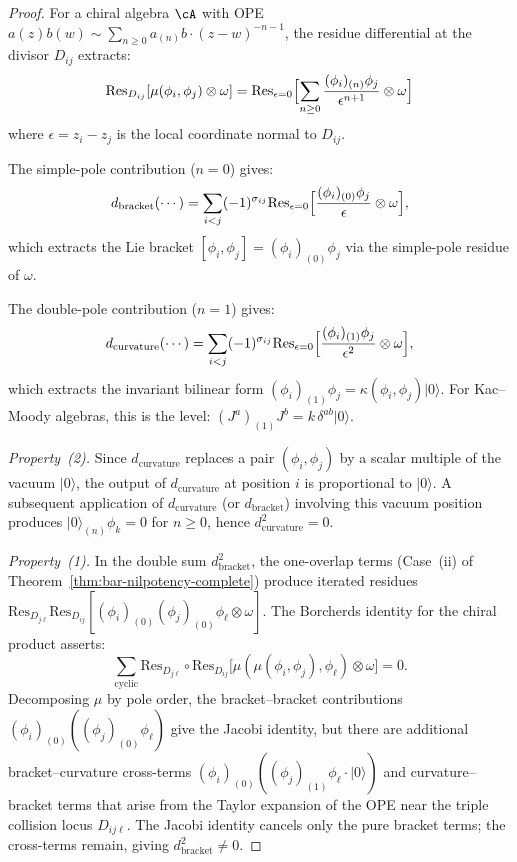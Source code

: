 \begin{proof}
For a chiral algebra $\cA$ with OPE $a(z)b(w) \sim \sum_{n \geq 0} a_{(n)}b \cdot (z-w)^{-n-1}$, the residue differential at the divisor $D_{ij}$ extracts:
\[
\mathrm{Res}_{D_{ij}}[\mu(\phi_i, \phi_j) \otimes \omega]
  = \mathrm{Res}_{\epsilon=0}\Bigl[\sum_{n \geq 0}
    \frac{(\phi_i)_{(n)}\phi_j}{\epsilon^{n+1}} \otimes \omega\Bigr]
\]
where $\epsilon = z_i - z_j$ is the local coordinate normal to $D_{ij}$.

The simple-pole contribution ($n = 0$) gives:
\[
d_{\mathrm{bracket}}(\cdots) = \sum_{i < j} (-1)^{\sigma_{ij}}
  \mathrm{Res}_{\epsilon=0}\Bigl[\frac{(\phi_i)_{(0)}\phi_j}{\epsilon}
    \otimes \omega\Bigr],
\]
which extracts the Lie bracket $[\phi_i, \phi_j] = (\phi_i)_{(0)}\phi_j$ via the simple-pole residue of $\omega$.

The double-pole contribution ($n = 1$) gives:
\[
d_{\mathrm{curvature}}(\cdots) = \sum_{i < j} (-1)^{\sigma_{ij}}
  \mathrm{Res}_{\epsilon=0}\Bigl[\frac{(\phi_i)_{(1)}\phi_j}{\epsilon^2}
    \otimes \omega\Bigr],
\]
which extracts the invariant bilinear form $(\phi_i)_{(1)}\phi_j = \kappa(\phi_i, \phi_j)|0\rangle$.  For Kac--Moody algebras, this is the level: $(J^a)_{(1)}J^b = k\,\delta^{ab}|0\rangle$.

\emph{Property~(2).}  Since $d_{\mathrm{curvature}}$ replaces a pair $(\phi_i, \phi_j)$ by a scalar multiple of the vacuum $|0\rangle$, the output of $d_{\mathrm{curvature}}$ at position $i$ is proportional to $|0\rangle$.  A subsequent application of $d_{\mathrm{curvature}}$ (or $d_{\mathrm{bracket}}$) involving this vacuum position produces $|0\rangle_{(n)}\phi_k = 0$ for $n \geq 0$, hence $d_{\mathrm{curvature}}^2 = 0$.

\emph{Property~(1).}  In the double sum $d_{\mathrm{bracket}}^2$, the one-overlap terms (Case~(ii) of Theorem~\ref{thm:bar-nilpotency-complete}) produce iterated residues $\mathrm{Res}_{D_{j\ell}}\mathrm{Res}_{D_{ij}}[(\phi_i)_{(0)}(\phi_j)_{(0)}\phi_\ell \otimes \omega]$.  The Borcherds identity for the chiral product asserts:
\begin{equation}\label{eq:borcherds-pole-mix}
\sum_{\text{cyclic}} \mathrm{Res}_{D_{j\ell}} \circ \mathrm{Res}_{D_{ij}}
  \bigl[\mu(\mu(\phi_i, \phi_j), \phi_\ell) \otimes \omega\bigr] = 0.
\end{equation}
Decomposing $\mu$ by pole order, the bracket--bracket contributions $(\phi_i)_{(0)}((\phi_j)_{(0)}\phi_\ell)$ give the Jacobi identity, but there are additional bracket--curvature cross-terms $(\phi_i)_{(0)}((\phi_j)_{(1)}\phi_\ell \cdot |0\rangle)$ and curvature--bracket terms that arise from the Taylor expansion of the OPE near the triple collision locus $D_{ij\ell}$.  The Jacobi identity cancels only the pure bracket terms; the cross-terms remain, giving $d_{\mathrm{bracket}}^2 \neq 0$.


\end{proof}
